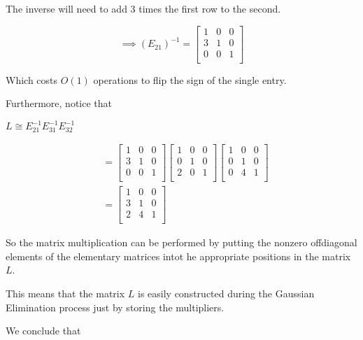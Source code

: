 \documentclass[12pt]{article}
\begin{document}
The inverse will need to add 3 times the first row to the second.

\begin{equation*}
  \implies (E_{21})^{-1} = \begin{bmatrix}
    1 & 0 & 0\\
    3 & 1 & 0\\
    0 & 0 & 1\\
  \end{bmatrix}
\end{equation*}

Which costs $O(1)$ operations to flip the sign of the single entry.

Furthermore, notice that 

$L \cong E_{21}^{-1}E_{31}^{-1}E_{32}^{-1}$

\begin{align*}
  &= \begin{bmatrix}
  1 & 0 & 0\\
  3 & 1 & 0\\
  0 & 0 & 1\\
  \end{bmatrix} \begin{bmatrix}
  1 & 0 & 0\\
  0 & 1 & 0\\
  2 & 0 & 1\\
  \end{bmatrix} \begin{bmatrix}
  1 & 0 & 0\\
  0 & 1 & 0\\
  0 & 4 & 1\\
  \end{bmatrix} \\
  &= \begin{bmatrix}
  1 & 0 & 0\\
  3 & 1 & 0\\
  2 & 4 & 1\\
  \end{bmatrix}
\end{align*}

So the matrix multiplication can be performed by putting the nonzero offdiagonal
elements of the elementary matrices intot he appropriate positions in the matrix
$L$.

This means that the matrix $L$ is easily constructed during the Gaussian
Elimination process just by storing the multipliers.

We conclude that
\end{document}
